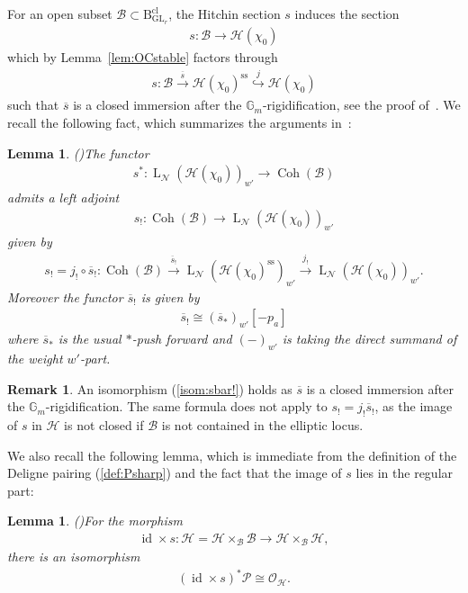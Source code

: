 \documentclass[11pt,oneside,a4paper,mathscr]{amsart}
\newtheorem{lemma}[thm]{Lemma}
\theoremstyle{definition}
\newtheorem{remark}[thm]{Remark}
\newcommand{\LL}{\operatorname{L}}
\newcommand{\cH}{\mathcal{H}}
\newcommand{\cB}{\mathcal{B}}
\newcommand{\cP}{\mathcal{P}}
\newcommand{\cO}{\mathcal{O}}
\newcommand{\rB}{\mathrm{B}}
\newcommand{\Coh}{\operatorname{Coh}}
\newcommand{\id}{\operatorname{id}}
\newcommand{\GL}{\operatorname{GL}}
\begin{document}
For an open subset $\cB \subset \rB_{\GL_r}^{\mathrm{cl}}$, 
the Hitchin section $s$ 
induces the section 
\begin{align*}
    s \colon \cB \to \cH(\chi_0)
\end{align*}
which by Lemma~\ref{lem:OCstable} factors through 
\begin{align*}
    s\colon \cB \stackrel{\overline{s}}{\to} \cH(\chi_0)^{\mathrm{ss}} \stackrel{j}{\hookrightarrow} \cH(\chi_0)
\end{align*}
such that $\overline{s}$ is a closed immersion after the $\mathbb{G}_m$-rigidification, see the proof of~\cite[Lemma~4.3]{TodaGL2}.
We recall the following fact, which summarizes the arguments in~\cite[Section~4.2]{TodaGL2}:
\begin{lemma}\emph{(\cite[Section~4.2, Lemma~4.3]{TodaGL2})}\label{lem:factori}
The functor 
\begin{align*}
    s^* \colon \LL_{\mathcal{N}}(\cH(\chi_0))_{w'} \to \Coh(\cB)
\end{align*}
admits a left adjoint
\begin{align}\label{sleft}
   s_{!} \colon \Coh(\cB) \to \LL_{\mathcal{N}}(\cH(\chi_0))_{w'}
\end{align}
given by 
\begin{align}\label{formula:sbar}
    s_{!}=j_{!} \circ \overline{s}_{!} \colon 
    \Coh(\cB) \stackrel{\overline{s}_!}{\to} \LL_{\mathcal{N}}(\cH(\chi_0)^{\mathrm{ss}})_{w'} \stackrel{j_!}{\to}
    \LL_{\mathcal{N}}(\cH(\chi_0))_{w'}.
\end{align}
Moreover 
the 
functor $\overline{s}_{!}$ is given by 
\begin{align}\label{isom:sbar!}
    \overline{s}_!\cong(\overline{s}_{*})_{w'}[-p_a]
\end{align}
where $\overline{s}_{*}$ is the usual $*$-push forward and $(-)_{w'}$ is taking the direct summand of the weight $w'$-part.
\end{lemma}
\begin{remark}\label{rmk:sstar}
An isomorphism (\ref{isom:sbar!}) holds as $\overline{s}$ is a closed immersion 
after the $\mathbb{G}_m$-rigidification. The same formula does not apply to 
$s_{!}=j_{!}\overline{s}_!$, as the image of $s$ in $\cH$ is not closed if $\cB$ is not contained in the elliptic locus. 
\end{remark}


We also recall the following lemma, which is immediate from the definition of the Deligne pairing (\ref{def:Psharp}) and the fact that the image of $s$ lies in the regular part: 
\begin{lemma}\emph{(\cite[Lemma~4.2]{TodaGL2})}\label{lem:ids}
For the morphism 
\begin{align*}
    \id \times s\colon \cH=\cH\times_{\cB} \cB \to \cH\times_{\cB} \cH, 
\end{align*}
there is an isomorphism 
\begin{align*}
    (\id\times s)^* \cP \cong \cO_{\cH}.
\end{align*}
\end{lemma}
\end{document}
